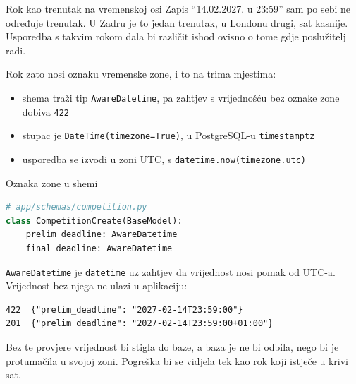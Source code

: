 \begin{frame}{Rok kao trenutak na vremenskoj osi}
Zapis \enquote{14.02.2027. u 23:59} sam po sebi ne određuje trenutak. U Zadru je to jedan trenutak, u Londonu drugi, sat kasnije. Usporedba s takvim rokom dala bi različit ishod ovisno o tome gdje poslužitelj radi.

\vspace{0.7em}
Rok zato nosi oznaku vremenske zone, i to na trima mjestima:

\begin{itemize}
  \itemsep0.4em
  \item shema traži tip \texttt{AwareDatetime}, pa zahtjev s vrijednošću bez oznake zone dobiva \texttt{422}
  \item stupac je \texttt{DateTime(timezone=True)}, u PostgreSQL-u \texttt{timestamptz}
  \item usporedba se izvodi u zoni UTC, s \texttt{datetime.now(timezone.utc)}
\end{itemize}

\end{frame}

\begin{frame}[fragile]{Oznaka zone u shemi}
\begin{lstlisting}[language=python]
# app/schemas/competition.py
class CompetitionCreate(BaseModel):
    prelim_deadline: AwareDatetime
    final_deadline: AwareDatetime
\end{lstlisting}

\vspace{0.3em}
\texttt{AwareDatetime} je \texttt{datetime} uz zahtjev da vrijednost nosi pomak od UTC-a. Vrijednost bez njega ne ulazi u aplikaciju:

\begin{lstlisting}
422  {"prelim_deadline": "2027-02-14T23:59:00"}
201  {"prelim_deadline": "2027-02-14T23:59:00+01:00"}
\end{lstlisting}

\vspace{0.2em}
Bez te provjere vrijednost bi stigla do baze, a baza je ne bi odbila, nego bi je protumačila u svojoj zoni. Pogreška bi se vidjela tek kao rok koji istječe u krivi sat.
\end{frame}


